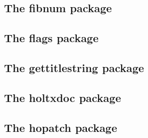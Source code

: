 \documentclass[a4paper,12pt]{article}
\makeatletter
\newcommand*{\xpackage}[1]{\textsf{#1}}
\newcommand*{\cs}[1]{\texttt{\textbackslash#1}}
\newcommand*{\tocinclude}[1]{%
  \setcounter{tocdepth}{3}%
  \begingroup
    \makeatletter
    \def\@prj{#1}%
    \let\contentsline\foreign@contentsline
  \endgroup
}
\def\foreign@contentsline#1#2#3#4{%
  \ifx\\#4\\%
    \csname l@#1\endcsname{#2}{#3}%
  \else
    \ifHy@linktocpage
      \csname l@#1\endcsname{{#2}}{%
        \hyper@linkfile{#3}{\@prj.pdf}{#4}%
      }%
    \else
      \csname l@#1\endcsname{%
        \hyper@linkfile{#2}{\@prj.pdf}{#4}%
      }{#3}%
    \fi
  \fi
}%
\newcommand*{\pkgsectformat}[1]{%
  \texorpdfstring{%
    \textcolor{link}{The} %
    \xpackage{#1} %
    \textcolor{link}{package}%
  }{#1}%
}
\makeatother
\begin{document}
\newpage
\subsection{\pkgsectformat{fibnum}}
\label{fibnum}
\begin{abstract}
The package \xpackage{fibnum} provides expandable fibonacci
numbers for both  and .
\end{abstract}
\tocinclude{fibnum}

\newpage
\subsection{\pkgsectformat{flags}}
\label{flags}
\begin{abstract}
Package \xpackage{flags} allows the setting and clearing
of flags in bit fields and converts the bit field into a
decimal number. Currently the bit field is limited to 31 bits.
\end{abstract}
\tocinclude{flags}

\newpage
\subsection{\pkgsectformat{gettitlestring}}
\label{gettitlestring}
\begin{abstract}
The \LaTeX\ package addresses packages that are dealing with
references to titles (\cs{section}, \cs{caption}, \dots).
The package tries to remove \cs{label} and other
commands from title strings.
\end{abstract}
\tocinclude{gettitlestring}

\newpage
\subsection{\pkgsectformat{holtxdoc}}
\label{holtxdoc}
\begin{abstract}
The package is used for the documentation of my packages in
DTX format. It contains some private macros and setup for
my needs. Thus do not use it. I have separated the part
that may be useful for others in package \xpackage{hypdoc}.
\end{abstract}
\tocinclude{holtxdoc}

\newpage
\subsection{\pkgsectformat{hopatch}}
\label{hopatch}
\begin{abstract}
This packages provides a wrapper to various package hooks
provided by other packages or classes, but does not define
own hooks.
\end{abstract}
\tocinclude{hopatch}
\end{document}
